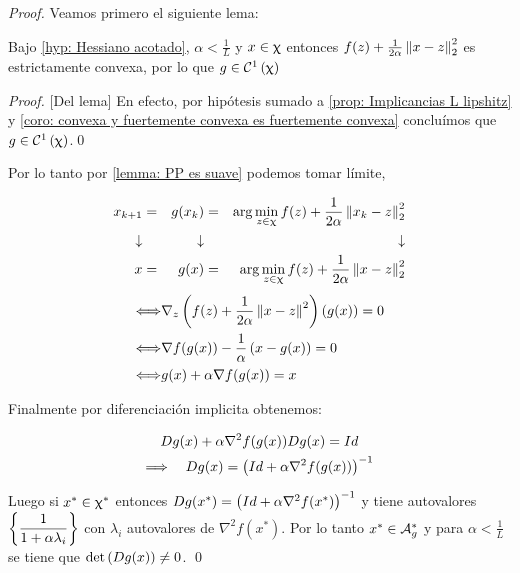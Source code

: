 \begin{proof}
	Veamos primero el siguiente lema:
	
	\begin{lemma}
		\label{lemma: PP es suave}
		Bajo \ref{hyp: Hessiano acotado}, $\alpha < \frac{1}{L}$ y $x \in \upchi$ entonces $f(z) + \frac{1}{2 \alpha} \left\lVert x- z\right\rVert_2^2$ es estrictamente convexa, por lo que $g \in \mathcal{C}^1 \left(\upchi\right)$
	\end{lemma}

	\begin{proof}{[Del lema]}
		En efecto, por hip\'otesis sumado a \ref{prop: Implicancias L lipshitz} y \ref{coro: convexa y fuertemente convexa es fuertemente convexa} conclu\'imos que $g \in \mathcal{C}^1 \left(\upchi\right)$.\qed
	\end{proof}
	
	Por lo tanto por \ref{lemma: PP es suave} podemos tomar l\'imite, \ie
	
	\begin{equation*}
	\begin{aligned}
	x_{k+1} & = & g(x_k) & = & \arg \min\limits_{z \in \upchi}{f(z) + \dfrac{1}{2\alpha}\left\lVert x_k - z\right\rVert_{2}^{2}} \\
	\downarrow & & \downarrow & & \downarrow \\
	x & = & g(x) & = & \arg \min\limits_{z \in \upchi}{f(z) + \dfrac{1}{2\alpha}\left\lVert x - z\right\rVert_{2}^{2}}
	\end{aligned}
	\end{equation*}
	\begin{equation*}
	\begin{aligned}
	\Longleftrightarrow & \nabla_z \left(f(z) + \frac{1}{2 \alpha} \left\lVert x-z\right\rVert^2\right)(g(x)) = 0 \\
	\Longleftrightarrow & \nabla f(g(x)) - \frac{1}{\alpha} \left(x-g(x)\right) = 0 \\
	\Longleftrightarrow & g(x) + \alpha \nabla f(g(x)) = x
	\end{aligned}
	\end{equation*}
	
	Finalmente por diferenciaci\'on implicita obtenemos:
	
	\begin{gather*}
		Dg(x) + \alpha\nabla^2 f (g(x))Dg(x) = Id \\
		\Longrightarrow \quad Dg(x) = \left(Id + \alpha \nabla^2 f(g(x))\right)^{-1}
	\end{gather*}

	Luego si $x^* \in \upchi^*$ entonces $Dg(x^*) = \left(Id + \alpha \nabla^2 f(x^*)\right)^{-1}$ y tiene autovalores $\left\lbrace\dfrac{1}{1+ \alpha \lambda_i}\right\rbrace$ con $\lambda_i$ autovalores de $\nabla^2 f(x^*)$. Por lo tanto $x^* \in \mathcal{A}_{g}^{*}$ y para $\alpha < \frac{1}{L}$ se tiene que $\det \left(Dg(x)\right) \neq 0$. \qed
	
\end{proof}


